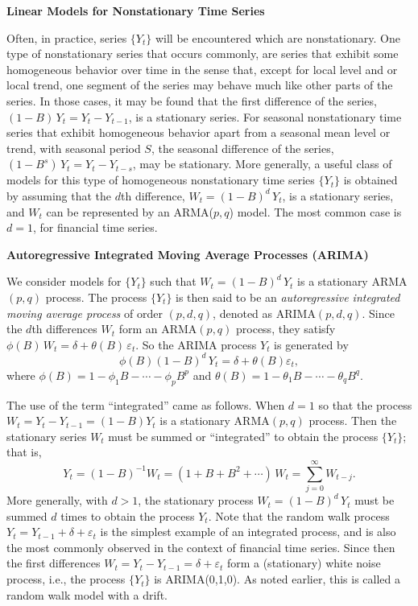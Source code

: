 \noindent\textbf{Linear Models for Nonstationary Time Series} \label{in:nonstat2} \twomedskip


Often, in practice, series $\{ Y_t \}$ will be encountered which are nonstationary. One type of nonstationary series that occurs commonly, are series that exhibit some homogeneous behavior over time in the sense that, except for local level and or local trend, one segment of the series may behave much like other parts of the series. In those cases, it may be found that the first difference of the series, $(1 - B)\, Y_t = Y_t - Y_{t-1}$, is a stationary series. For seasonal nonstationary time series that exhibit homogeneous behavior apart from a seasonal mean level or trend, with seasonal period $S$, the seasonal difference of the series, $(1 - B^s)\, Y_t = Y_t - Y_{t-s}$, may be stationary. More generally, a useful class of models for this type of homogeneous nonstationary time series $\{Y_t\}$ is obtained by assuming that the $d$th difference, $W_t = (1 - B)^d\,Y_t$, is a stationary series, and $W_t$ can be represented by an ARMA($p,q$) model. The most common case is $d=1$, for financial time series. \twomedskip


\noindent\textbf{Autoregressive Integrated Moving Average Processes (ARIMA)} \twomedskip


We consider models for $\{ Y_t \}$ such that $W_t = (1 - B)^d\, Y_t$ is a stationary ARMA$(p,q)$ process. The process $\{ Y_t \}$ is then said to be an \emph{autoregressive integrated moving average process} of order $(p,d,q)$, denoted as ARIMA$(p,d,q)$. Since the $d$th differences $W_t$ form an ARMA$(p,q)$ process, they satisfy $\phi(B)\, W_t = \delta + \theta(B)\, \varepsilon_t$. So the ARIMA process $Y_t$ is generated by 
	\begin{equation} \label{eqn:phiBdy}
	\phi(B)(1 - B)^d\, Y_t = \delta + \theta(B)\varepsilon_t,
	\end{equation}
where $\phi(B) = 1 - \phi_1 B - \cdots - \phi_p B^p$ and $\theta(B) = 1 - \theta_1 B - \cdots - \theta_q B^q$.


The use of the term ``integrated'' came as follows. When $d=1$ so that the process $W_t = Y_t - Y_{t-1}= (1-B)Y_t$ is a stationary ARMA$(p,q)$ process. Then the stationary series $W_t$ must be summed or ``integrated'' to obtain the process $\{Y_t\}$; that is,
	\[
	Y_t = (1 - B)^{-1}W_t = (1 + B + B^2 + \cdots)\, W_t = \sum_{j=0}^\infty W_{t-j}. 
	\]
More generally, with $d > 1$, the stationary process $W_t = (1 - B)^d\, Y_t$ must be summed $d$ times to obtain the process $Y_t$. Note that the random walk process \label{in:random1} $Y_t = Y_{t-1} + \delta + \varepsilon_t$ is the simplest example of an integrated process, and is also the most commonly observed in the context of financial time series. Since then the first differences $W_t = Y_t - Y_{t-1} = \delta + \varepsilon_t$ form a (stationary) white noise process, i.e., the process $\{ Y_t \}$ is ARIMA(0,1,0). As noted earlier, this is called a random walk model with a drift.


